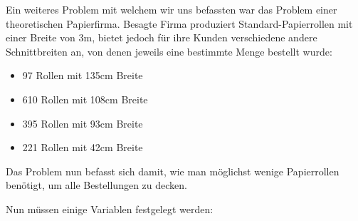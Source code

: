 Ein weiteres Problem mit welchem wir uns befassten war das Problem einer theoretischen Papierfirma. Besagte Firma produziert Standard-Papierrollen mit einer Breite von 3m, bietet jedoch für ihre Kunden verschiedene andere Schnittbreiten an, von denen jeweils eine bestimmte Menge bestellt wurde:
\begin{itemize}
\item 97 Rollen mit 135cm Breite
\item 610  Rollen mit 108cm Breite
\item 395  Rollen mit 93cm Breite
\item 221  Rollen mit 42cm Breite
\end{itemize}

Das Problem nun befasst sich damit, wie man möglichst wenige Papierrollen benötigt, um alle Bestellungen zu decken.

Nun müssen einige Variablen festgelegt werden:

